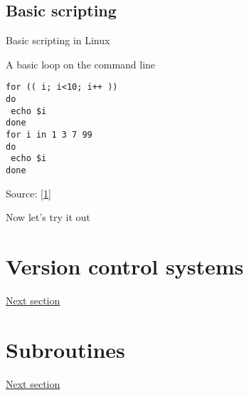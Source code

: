 \documentclass[xcolor=table,compress]{beamer}
\begin{document}
\subsection{Basic scripting}
\begin{frame}[fragile]{Basic scripting in Linux}
\begin{block}{A basic loop on the command line}
\begin{verbatim}
for (( i; i<10; i++ ))
do 
 echo $i
done
for i in 1 3 7 99
do
 echo $i
done
\end{verbatim}

\end{block}
\end{frame}


\begin{frame}
\tiny{Source: \href{http://www.cyberciti.biz/faq/bash-for-loop/}{[1]}}
\end{frame}
\begin{frame}
Now let's try it out
\end{frame}

\section[VCS]{Version control systems}
\begin{frame}
\href{day1-2.pdf}{Next section}
\end{frame}

\section{Subroutines}
\begin{frame}
\href{day1-3.pdf}{Next section}
\end{frame}
\end{document}
